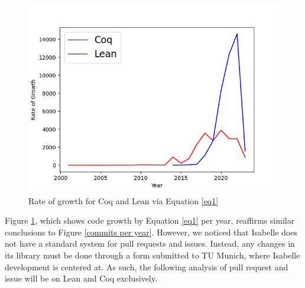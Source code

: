 \documentclass[sigconf,nonacm]{acmart}
\begin{document}
\begin{figure}[H]
  \includegraphics[scale=0.5]{rate.png}
  \caption{Rate of growth for Coq and Lean via Equation \ref{eq1}}
  \label{rate of growth}
\end{figure}

Figure \ref{rate of growth}, which shows code growth by Equation \ref{eq1} per year, reaffirms similar conclusions to Figure \ref{commits per year}. However, we noticed that Isabelle does not have a standard system for pull requests and issues. Instead, any changes in its library must be done through a form submitted to TU Munich, where Isabelle development is centered at. As such, the following analysis of pull request and issue will be on Lean and Coq exclusively. 
\end{document}
